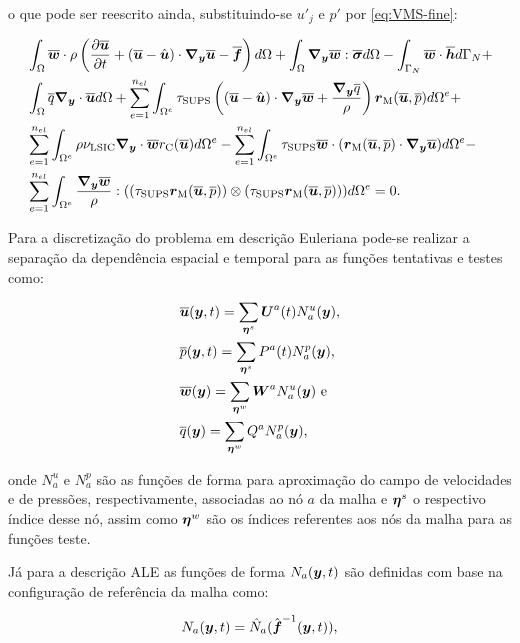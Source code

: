 \noindent o que pode ser reescrito ainda, substituindo-se $u'_j$ e $p'$ por \eqref{eq:VMS-fine}:

\begin{equation}
    \begin{split}
        &\intDom{\BBB{w}\cdot\rho\bigpar{\dvt{\BBB{u}}+(\BBB{u}-\HBB{u})\cdot\Ny\BBB{u}-\BBB{f}}}+\intDom{\Ny\BBB{w}:\bar{\tens}}-\intNeumann{\BBB{w}\cdot\BBB{h}}+\\
        &\intDom{\bar{q}\Ny\cdot\BBB{u}}+\SintDom{\tau_\sups\bigpar{(\BBB{u}-\HBB{u})\cdot\Ny\BBB{w}+\frac{\Ny\bar{q}}{\rho}}\rM}+\\
        &\SintDom{\rho\nu_\lsic\Ny\cdot\BBB{w}\rC}-\SintDom{\tau_\sups\BBB{w}\cdot(\rM\cdot\Ny\BBB{u})}-\\
        &\SintDom{\frac{\Ny\BBB{w}}{\rho}:((\tau_\sups\rM)\otimes(\tau_\sups\rM))}=0
        \text{.}
        \label{eq:RBVMS1}
    \end{split}
\end{equation}

Para a discretização do problema em descrição Euleriana pode-se realizar a separação da dependência espacial e temporal para as funções tentativas e testes como:

\begin{subequations}
    \begin{align}
         & \overline{\boldsymbol{u}}(\boldsymbol{y},t)=\sum_{\boldsymbol{\eta}^s}{\boldsymbol{U}^a(t)N_a^u(\boldsymbol{y})}\text{,}\label{eq:uh} \\
         & \overline{p}(\boldsymbol{y},t)=\sum_{\boldsymbol{\eta}^s}{P^a(t)N_a^p(\boldsymbol{y})}\text{,}                   \\
         & \overline{\boldsymbol{w}}(\boldsymbol{y})=\sum_{\boldsymbol{\eta}^w}{\boldsymbol{W}^aN_a^u(\boldsymbol{y})}\text{ e}\label{eq:w-sep}  \\
         & \overline{q}(\boldsymbol{y})=\sum_{\boldsymbol{\eta}^w}{Q^aN_a^p(\boldsymbol{y})}\text{,}\label{eq:q-sep}
    \end{align}
\end{subequations}

\noindent onde $N_a^u$ e $N_a^p$ são as funções de forma para aproximação do campo de velocidades e de pressões, respectivamente, associadas ao nó $a$ da malha e $\boldsymbol{\eta}^s$ o respectivo índice desse nó, assim como $\boldsymbol{\eta}^w$ são os índices referentes aos nós da malha para as funções teste.

Já para a descrição ALE as funções de forma $N_a(\boldsymbol{y},t)$ são definidas com base na configuração de referência da malha como:

\begin{equation}
    N_a(\boldsymbol{y},t)=\hat{N}_a(\hat{\boldsymbol{f}}^{-1}(\boldsymbol{y},t))\text{,}
\end{equation}

